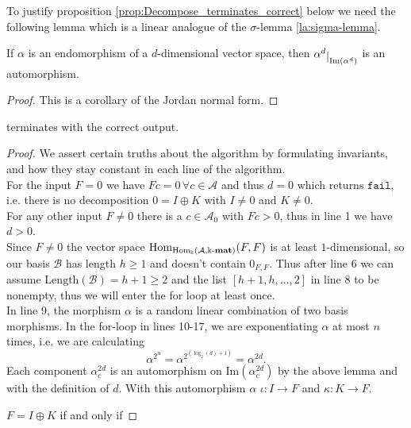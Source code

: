 To justify proposition \ref{prop:Decompose_terminates_correct} below we need the following lemma which is a linear analogue of the $\sigma$-lemma
\ref{la:sigma-lemma}.

\begin{lemma}
If $\alpha$ is an endomorphism of a $d$-dimensional vector space, then $\alpha^{d}\restrict{\mathrm{Im}(\alpha^{d})}$ is an automorphism.
\end{lemma}
\begin{proof}
This is a corollary of the Jordan normal form.
\end{proof}

\begin{proposition}\label{prop:Decompose_terminates_correct}
 terminates with the correct output.
\end{proposition}
\begin{proof} We assert certain truths about the algorithm by formulating invariants, and how they stay constant in each line of the algorithm.\\

\noindent For the input $F = 0$ we have $Fc = 0\,\forall c \in \mathcal{A}$ and thus $d = 0$ which returns $\mathtt{fail}$, i.e. there is no
decomposition $0 = I \oplus K$ with $I \neq 0$ and $K \neq 0$.\\

\noindent For any other input $F \neq 0$ there is a $c \in \mathcal{A}_{0}$ with $Fc > 0$, thus in line 1 we have $d > 0$.\\
Since $F \neq 0$ the vector space $\mathrm{Hom}_{\mathrm{Hom_{\Bbbk}}(\mathcal{A},\Bbbk\textnormal{-}\mathbf{mat})}(F,F)$ is at least $1$-dimensional, so our basis $\mathcal{B}$ has
length $h \geq 1$ and doesn't contain $0_{F,F}$. Thus after line 6 we can assume $\mathrm{Length}(\mathcal{B}) = h+1 \geq 2$ and
the list $[h+1,h,\dots,2]$ in line 8 to be nonempty, thus we will enter the for loop at least once.\\

\noindent In line 9, the morphism $\alpha$ is a random linear combination of two basis morphisms. In the for-loop in lines 10-17, we are
exponentiating $\alpha$ at most $n$ times, i.e. we are calculating
\[\alpha^{2^{n}} = \alpha^{2^{(\log_{2}(d)+1)}} = \alpha^{2d}.
\]
Each component $\alpha_{c}^{2d}$ is an automorphism on $\mathrm{Im}(\alpha_{c}^{2d})$ by the above lemma and with the definition of $d$.
With this automorphism $\alpha$ 
$\iota : I \rightarrow F$ and $\kappa : K \rightarrow F$.

$F = I \oplus K$ if and only if 
\end{proof}

